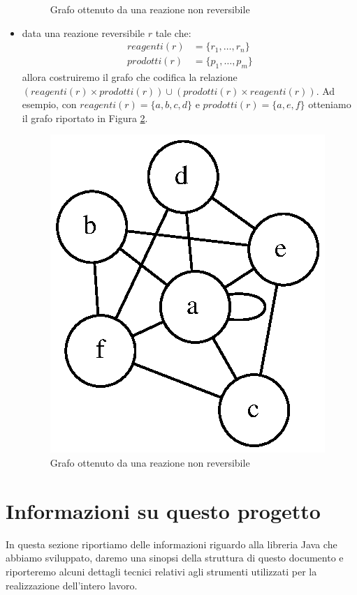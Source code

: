 \begin{itemize}
\begin{figure}
    \caption{Grafo ottenuto da una reazione non reversibile}
    \label{fig:non-reversible-reaction-mapping}
  \end{figure}
\item data una reazione reversibile $r$ tale che:
  \begin{displaymath}
    \begin{split} 
      reagenti(r) &= \{ r_{1}, \ldots, r_{n} \} \\
      prodotti(r) &= \{ p_{1}, \ldots, p_{m} \}
    \end{split}
  \end{displaymath}
  allora costruiremo il grafo che codifica la relazione $(reagenti(r)
  \times prodotti(r)) \cup (prodotti(r) \times reagenti(r))$. Ad
  esempio, con $reagenti(r) = \{ a, b, c, d \}$ e $prodotti(r) = \{a,
  e, f\}$ otteniamo il grafo riportato in Figura
  \ref{fig:reversible-reaction-mapping}.
  \begin{figure}
    \centering
    \includegraphics{images/reversible-reaction-example.dot.eps}
    \caption{Grafo ottenuto da una reazione non reversibile}
    \label{fig:reversible-reaction-mapping}
  \end{figure}
\end{itemize}

\section{Informazioni su questo progetto}
In questa sezione riportiamo delle informazioni riguardo alla libreria
Java che abbiamo sviluppato, daremo una sinopsi della struttura di
questo documento e riporteremo alcuni dettagli tecnici relativi agli
strumenti utilizzati per la realizzazione dell'intero lavoro.

